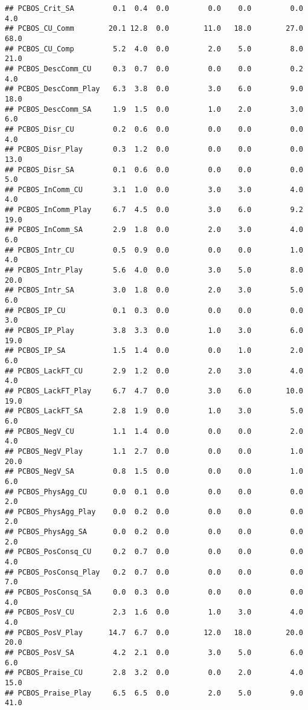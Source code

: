 \documentclass[
]{article}
\begin{document}
\begin{verbatim}
## PCBOS_Crit_SA         0.1  0.4  0.0         0.0    0.0         0.0   4.0
## PCBOS_CU_Comm        20.1 12.8  0.0        11.0   18.0        27.0  68.0
## PCBOS_CU_Comp         5.2  4.0  0.0         2.0    5.0         8.0  21.0
## PCBOS_DescComm_CU     0.3  0.7  0.0         0.0    0.0         0.2   4.0
## PCBOS_DescComm_Play   6.3  3.8  0.0         3.0    6.0         9.0  18.0
## PCBOS_DescComm_SA     1.9  1.5  0.0         1.0    2.0         3.0   6.0
## PCBOS_Disr_CU         0.2  0.6  0.0         0.0    0.0         0.0   4.0
## PCBOS_Disr_Play       0.3  1.2  0.0         0.0    0.0         0.0  13.0
## PCBOS_Disr_SA         0.1  0.6  0.0         0.0    0.0         0.0   5.0
## PCBOS_InComm_CU       3.1  1.0  0.0         3.0    3.0         4.0   4.0
## PCBOS_InComm_Play     6.7  4.5  0.0         3.0    6.0         9.2  19.0
## PCBOS_InComm_SA       2.9  1.8  0.0         2.0    3.0         4.0   6.0
## PCBOS_Intr_CU         0.5  0.9  0.0         0.0    0.0         1.0   4.0
## PCBOS_Intr_Play       5.6  4.0  0.0         3.0    5.0         8.0  20.0
## PCBOS_Intr_SA         3.0  1.8  0.0         2.0    3.0         5.0   6.0
## PCBOS_IP_CU           0.1  0.3  0.0         0.0    0.0         0.0   3.0
## PCBOS_IP_Play         3.8  3.3  0.0         1.0    3.0         6.0  19.0
## PCBOS_IP_SA           1.5  1.4  0.0         0.0    1.0         2.0   6.0
## PCBOS_LackFT_CU       2.9  1.2  0.0         2.0    3.0         4.0   4.0
## PCBOS_LackFT_Play     6.7  4.7  0.0         3.0    6.0        10.0  19.0
## PCBOS_LackFT_SA       2.8  1.9  0.0         1.0    3.0         5.0   6.0
## PCBOS_NegV_CU         1.1  1.4  0.0         0.0    0.0         2.0   4.0
## PCBOS_NegV_Play       1.1  2.7  0.0         0.0    0.0         1.0  20.0
## PCBOS_NegV_SA         0.8  1.5  0.0         0.0    0.0         1.0   6.0
## PCBOS_PhysAgg_CU      0.0  0.1  0.0         0.0    0.0         0.0   2.0
## PCBOS_PhysAgg_Play    0.0  0.2  0.0         0.0    0.0         0.0   2.0
## PCBOS_PhysAgg_SA      0.0  0.2  0.0         0.0    0.0         0.0   2.0
## PCBOS_PosConsq_CU     0.2  0.7  0.0         0.0    0.0         0.0   4.0
## PCBOS_PosConsq_Play   0.2  0.7  0.0         0.0    0.0         0.0   7.0
## PCBOS_PosConsq_SA     0.0  0.3  0.0         0.0    0.0         0.0   4.0
## PCBOS_PosV_CU         2.3  1.6  0.0         1.0    3.0         4.0   4.0
## PCBOS_PosV_Play      14.7  6.7  0.0        12.0   18.0        20.0  20.0
## PCBOS_PosV_SA         4.2  2.1  0.0         3.0    5.0         6.0   6.0
## PCBOS_Praise_CU       2.8  3.2  0.0         0.0    2.0         4.0  15.0
## PCBOS_Praise_Play     6.5  6.5  0.0         2.0    5.0         9.0  41.0

\end{verbatim}
\end{document}
